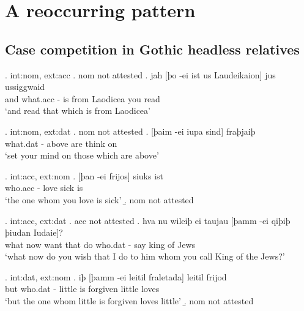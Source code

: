 
\chapter{A reoccurring pattern}

\section{Case competition in Gothic headless relatives}

\ex. \ac{int}:\ac{nom}, \ac{ext}:\ac{acc}
\a. \ac{nom} not attested
\bg. jah [þo -ei ist us Laudeikaion] jus ussiggwaid\\
 and what.\ac{acc} - is\scsub{[nom]} from Laodicea you read\scsub{[acc]}\\
 `and read that which is from Laodicea' 

\ex. \ac{int}:\ac{nom}, \ac{ext}:\ac{dat}
\a. \ac{nom} not attested
\bg. [þaim -ei iupa sind] fraþjaiþ\\
 what.\ac{dat} - above are\scsub{[nom]} {think on}\scsub{[dat]}\\
 `set your mind on those which are above' 

\ex. \ac{int}:\ac{acc}, \ac{ext}:\ac{nom}
\ag. [þan -ei frijos] siuks ist\\
 who.\ac{acc} - love\scsub{[acc]} sick is\scsub{[nom]}\\
 `the one whom you love is sick' 
\b. \ac{nom} not attested

\ex. \ac{int}:\ac{acc}, \ac{ext}:\ac{dat}
\a. \ac{acc} not attested
\bg. hva nu wileiþ ei taujau [þamm -ei qiþiþ þiudan Iudaie]?\\
 what now want that do\scsub{[dat]} who.\ac{dat} - say\scsub{[acc]} king {of Jews}\\
 `what now do you wish that I do to him whom you call King of the Jews?' 

\ex. \ac{int}:\ac{dat}, \ac{ext}:\ac{nom}
\ag. iþ [þamm -ei leitil fraletada] leitil frijod\\
 but who.\ac{dat} - little {is forgiven\scsub{[dat]}} little loves\scsub{[nom]}\\
 `but the one whom little is forgiven loves little' 
\b. \ac{nom} not attested

